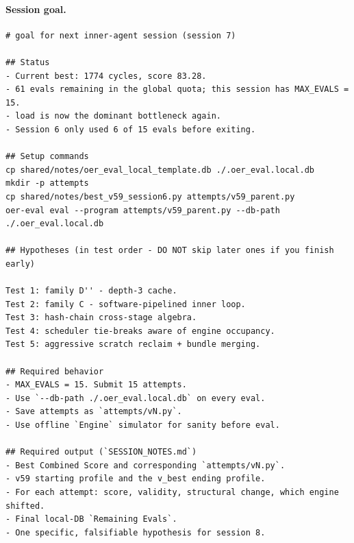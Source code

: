 \paragraph{Session goal.}
\begin{lstlisting}[style=papercode]
# goal for next inner-agent session (session 7)

## Status
- Current best: 1774 cycles, score 83.28.
- 61 evals remaining in the global quota; this session has MAX_EVALS = 15.
- load is now the dominant bottleneck again.
- Session 6 only used 6 of 15 evals before exiting.

## Setup commands
cp shared/notes/oer_eval_local_template.db ./.oer_eval.local.db
mkdir -p attempts
cp shared/notes/best_v59_session6.py attempts/v59_parent.py
oer-eval eval --program attempts/v59_parent.py --db-path ./.oer_eval.local.db

## Hypotheses (in test order - DO NOT skip later ones if you finish early)

Test 1: family D'' - depth-3 cache.
Test 2: family C - software-pipelined inner loop.
Test 3: hash-chain cross-stage algebra.
Test 4: scheduler tie-breaks aware of engine occupancy.
Test 5: aggressive scratch reclaim + bundle merging.

## Required behavior
- MAX_EVALS = 15. Submit 15 attempts.
- Use `--db-path ./.oer_eval.local.db` on every eval.
- Save attempts as `attempts/vN.py`.
- Use offline `Engine` simulator for sanity before eval.

## Required output (`SESSION_NOTES.md`)
- Best Combined Score and corresponding `attempts/vN.py`.
- v59 starting profile and the v_best ending profile.
- For each attempt: score, validity, structural change, which engine shifted.
- Final local-DB `Remaining Evals`.
- One specific, falsifiable hypothesis for session 8.
\end{lstlisting}

